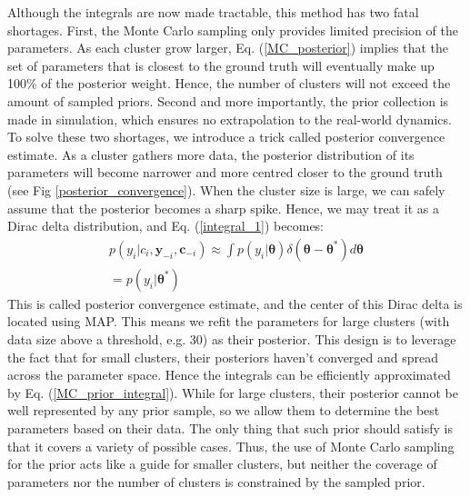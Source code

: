 Although the integrals are now made tractable, this method has two fatal shortages.
First, the Monte Carlo sampling only provides limited precision of the parameters.
As each cluster grow larger, Eq. (\ref{MC_posterior}) implies that the set of parameters that is closest to the ground truth will eventually make up 100\% of the posterior weight.
Hence, the number of clusters will not exceed the amount of sampled priors. 
Second and more importantly, the prior collection is made in simulation, which ensures no extrapolation to the real-world dynamics.
To solve these two shortages, we introduce a trick called posterior convergence estimate.
As a cluster gathers more data, the posterior distribution of its parameters will become narrower and more centred closer to the ground truth (see Fig \ref{posterior_convergence}).
When the cluster size is large, we can safely assume that the posterior becomes a sharp spike.
Hence, we may treat it as a Dirac delta distribution, and Eq. (\ref{integral_1}) becomes:
\begin{equation}
\begin{gathered}
p(y_i|c_i, \bm{y}_{-i}, \bm{c}_{-i}) \approx 
\int p(y_i|\bm{\theta})
\delta (\bm{\theta} - \bm{\theta}^*)
d\bm{\theta}
\\
= p(y_i|\bm{\theta}^*)
\end{gathered}
\label{posterior_convergence_estimate}
\end{equation}
This is called posterior convergence estimate, and the center of this Dirac delta is located using MAP. 
This means we refit the parameters for large clusters (with data size above a threshold, e.g. 30) as their posterior.
This design is to leverage the fact that for small clusters, their posteriors haven't converged and spread across the parameter space.
Hence the integrals can be efficiently approximated by Eq. (\ref{MC_prior_integral}).
While for large clusters, their posterior cannot be well represented by any prior sample, so we allow them to determine the best parameters based on their data.
The only thing that such prior should satisfy is that it covers a variety of possible cases.
Thus, the use of Monte Carlo sampling for the prior acts like a guide for smaller clusters, but neither the coverage of parameters nor the number of clusters is constrained by the sampled prior. 
